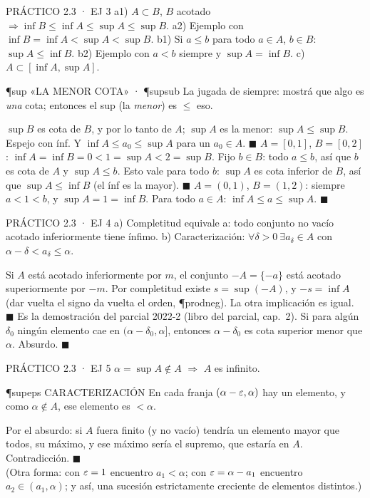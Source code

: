 \begin{enunciado}{PRÁCTICO 2.3 · EJ 3}
a1) $A\subset B$, $B$ acotado $\Rightarrow\inf B\le\inf A\le\sup A\le\sup B$. a2) Ejemplo con $\inf B=\inf A<\sup A<\sup B$. b1) Si $a\le b$ para todo $a\in A$, $b\in B$: $\sup A\le\inf B$. b2) Ejemplo con $a<b$ siempre y $\sup A=\inf B$. c) $A\subset[\inf A,\sup A]$.
\end{enunciado}
\begin{uso}{\P{sup} «LA MENOR COTA» · \P{supsub}}
La jugada de siempre: mostrá que algo es \emph{una} cota; entonces el sup (la \emph{menor}) es $\le$ eso.
\end{uso}
$\sup B$ es cota de $B$, y por lo tanto de $A$; $\sup A$ es la menor: $\sup A\le\sup B$. Espejo con ínf. Y $\inf A\le a_0\le\sup A$ para un $a_0\in A$. $\blacksquare$
$A=[0,1]$, $B=[0,2]$: $\inf A=\inf B=0<1=\sup A<2=\sup B$.
Fijo $b\in B$: todo $a\le b$, así que $b$ es cota de $A$ y $\sup A\le b$. Esto vale para todo $b$: $\sup A$ es cota inferior de $B$, así que $\sup A\le\inf B$ (el ínf es la mayor). $\blacksquare$
$A=(0,1)$, $B=(1,2)$: siempre $a<1<b$, y $\sup A=1=\inf B$.
Para todo $a\in A$: $\inf A\le a\le\sup A$. $\blacksquare$

\begin{enunciado}{PRÁCTICO 2.3 · EJ 4}
a) Completitud equivale a: todo conjunto no vacío acotado inferiormente tiene ínfimo. b) Caracterización: $\forall\delta>0\ \exists a_\delta\in A$ con $\alpha-\delta<a_\delta\le\alpha$.
\end{enunciado}
Si $A$ está acotado inferiormente por $m$, el conjunto $-A=\{-a\}$ está acotado superiormente por $-m$. Por completitud existe $s=\sup(-A)$, y $-s=\inf A$ (dar vuelta el signo da vuelta el orden, \P{prodneg}). La otra implicación es igual. $\blacksquare$
Es la demostración del parcial 2022-2 (libro del parcial, cap.\ 2). Si para algún $\delta_0$ ningún elemento cae en $(\alpha-\delta_0,\alpha]$, entonces $\alpha-\delta_0$ es cota superior menor que $\alpha$. Absurdo. $\blacksquare$

\begin{enunciado}{PRÁCTICO 2.3 · EJ 5}
$\alpha=\sup A\notin A$ $\Rightarrow$ $A$ es infinito.
\end{enunciado}
\begin{uso}{\P{supeps} CARACTERIZACIÓN}
En cada franja $(\alpha-\varepsilon,\alpha)$ hay un elemento, y como $\alpha\notin A$, ese elemento es $<\alpha$.
\end{uso}
Por el absurdo: si $A$ fuera finito (y no vacío) tendría un elemento mayor que todos, su máximo, y ese máximo sería el supremo, que estaría en $A$. Contradicción. $\blacksquare$\\
(Otra forma: con $\varepsilon=1$ encuentro $a_1<\alpha$; con $\varepsilon=\alpha-a_1$ encuentro $a_2\in(a_1,\alpha)$; y así, una sucesión estrictamente creciente de elementos distintos.)

